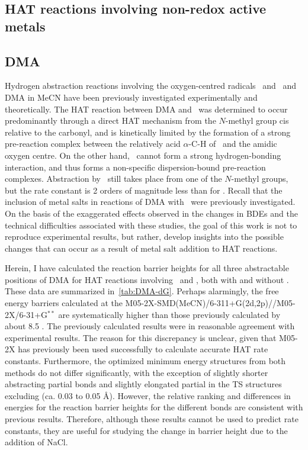 \begin{doublespace}
\section{HAT reactions involving non-redox active metals}

\subsection{DMA}

Hydrogen abstraction reactions involving the oxygen-centred radicals \bno\ and
\cumo\ and DMA in MeCN have been previously investigated experimentally and
theoretically.\cite{Salamone2013} The HAT reaction between DMA and \bno\ was
determined to occur predominantly through a direct HAT mechanism from the
$N$-methyl group cis relative to the carbonyl, and is kinetically limited by the
formation of a strong pre-reaction complex between the relatively acid
$\alpha$-C-H of \bno\ and the amidic oxygen centre. On the other hand, \cumo\
cannot form a strong hydrogen-bonding interaction, and thus forms a
non-specific dispersion-bound pre-reaction complexes. Abstraction by \cumo\
still takes place from one of the $N$-methyl groups, but the rate constant is 2
orders of magnitude less than for \bno. Recall that the inclusion of metal salts
in reactions of DMA with \cumo\ were previously
investigated.\cite{Salamone2015metals} On the basis of the exaggerated effects
observed in the changes in BDEs and the technical difficulties associated with
these studies, the goal of this work is not to reproduce experimental results,
but rather, develop insights into the possible changes that can occur as a
result of metal salt addition to HAT reactions.

Herein, I have calculated the reaction barrier heights for all three
abstractable positions of DMA for HAT reactions involving \cumo\ and \bno, both
with and without \ch{NaCl}. These data are summarized in~\ref{tab:DMA-dG}.
Perhaps alarmingly, the free energy barriers calculated at the
M05-2X-SMD(MeCN)/6-311+G(2d,2p)//M05-2X/6-31+G$^{**}$ are systematically higher
than those previously calculated by about 8.5 \kcalmol.\cite{Salamone2013} The
previously calculated results were in reasonable agreement with experimental
results. The reason for this discrepancy is unclear, given that M05-2X has
previously been used successfully to calculate accurate HAT rate
constants.\cite{Galano2013} Furthermore, the optimized minimum energy structures
from both methods do not differ significantly, with the exception of slightly
shorter abstracting \ch{C-H} partial bonds and slightly elongated \ch{O-H}
partial in the TS structures excluding \ch{NaCl} (ca. 0.03 to 0.05 \AA).
However, the relative ranking and differences in energies for the reaction
barrier heights for the different \ch{C-H} bonds are consistent with previous
results. Therefore, although these results cannot be used to predict rate
constants, they are useful for studying the change in barrier height due to the
addition of NaCl.


\end{doublespace}
